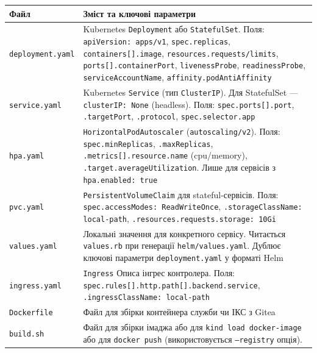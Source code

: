 \documentclass[12pt,a4paper]{article}
\begin{document}
\vspace{8pt}
\begin{longtable}{L{3.8cm} L{10.2cm}}
\toprule
{}
\color{primary}\textbf{Файл} & \color{primary}\textbf{Зміст та ключові параметри} \\
\midrule\endhead\bottomrule\endfoot
\texttt{deployment.yaml}
  & Kubernetes \texttt{Deployment} або \texttt{StatefulSet}.
    Поля: \texttt{apiVersion: apps/v1}, \texttt{spec.replicas},
    \texttt{containers[].image}, \texttt{resources.requests/limits},
    \texttt{ports[].containerPort}, \texttt{livenessProbe},
    \texttt{readinessProbe}, \texttt{serviceAccountName},
    \texttt{affinity.podAntiAffinity} \\[4pt]
\texttt{service.yaml}
  & Kubernetes \texttt{Service} (тип \texttt{ClusterIP}).
    Для StatefulSet --- \texttt{clusterIP: None} (headless).
    Поля: \texttt{spec.ports[].port}, \texttt{.targetPort},
    \texttt{.protocol}, \texttt{spec.selector.app} \\[4pt]
\texttt{hpa.yaml}
  & \texttt{HorizontalPodAutoscaler} (\texttt{autoscaling/v2}).
    Поля: \texttt{spec.minReplicas}, \texttt{.maxReplicas},
    \texttt{.metrics[].resource.name} (cpu/memory),
    \texttt{.target.averageUtilization}.
    Лише для сервісів з \texttt{hpa.enabled: true} \\[4pt]
\texttt{pvc.yaml}
  & \texttt{PersistentVolumeClaim} для stateful-сервісів.
    Поля: \texttt{spec.accessModes: ReadWriteOnce},
    \texttt{.storageClassName: local-path},
    \texttt{.resources.requests.storage: 10Gi} \\[4pt]
\texttt{values.yaml}
  & Локальні значення для конкретного сервісу.
    Читається \texttt{values.rb} при генерації \texttt{helm/values.yaml}.
    Дублює ключові параметри \texttt{deployment.yaml} у форматі Helm \\[4pt]
\texttt{ingress.yaml}
  & \texttt{Ingress} Описа інгрес контролера.
    Поля: \texttt{spec.rules[].http.path[].backend.service},
    \texttt{.ingressClassName: local-path} \\[4pt]
\texttt{Dockerfile}
  & Файл для збірки контейнера служби чи ІКС з Gitea \\[4pt]
\texttt{build.sh}
  & Файл для збірки імаджа або для \texttt{kind load docker-image} або для \texttt{docker push} (використовується \texttt{--registry} опція).
 \\[4pt]
\end{longtable}
\end{document}
